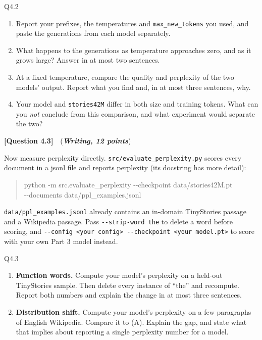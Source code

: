 \documentclass[11pt]{article}
\newcommand{\question}[3]{%
  \vspace{0.9em}
  \noindent\textbf{[Question #1]}\ \ (\textit{\textbf{#2, #3 points}})\quad
}
\begin{document}
\begin{deliverables}{Q4.2}
\begin{enumerate}[label=\Alph*., leftmargin=1.6em]
  \item Report your prefixes, the temperatures and \texttt{max\_new\_tokens} you used, and paste
    the generations from each model separately.
  \item What happens to the generations as temperature approaches zero, and as it grows large?
    Answer in at most two sentences.
  \item At a fixed temperature, compare the quality and perplexity of the two models' output.
    Report what you find and, in at most three sentences, why.
  \item Your model and \texttt{stories42M} differ in both size and training tokens. What can you
    \emph{not} conclude from this comparison, and what experiment would separate the two?
\end{enumerate}
\end{deliverables}

\question{4.3}{Writing}{12}
Now measure perplexity directly. \texttt{src/evaluate\_perplexity.py} scores every document in a
jsonl file and reports perplexity (its docstring has more detail):

\begin{quote}\small\ttfamily
python -m src.evaluate\_perplexity -\/-checkpoint data/stories42M.pt \\
\hspace*{2em}-\/-documents data/ppl\_examples.jsonl
\end{quote}

\noindent \texttt{data/ppl\_examples.jsonl} already contains an in-domain TinyStories passage and a
Wikipedia passage. Pass \texttt{-\/-strip-word the} to delete a word before scoring, and
\texttt{-\/-config <your config> -\/-checkpoint <your model.pt>} to score with your own Part 3 model
instead.

\begin{deliverables}{Q4.3}
\begin{enumerate}[label=\Alph*., leftmargin=1.6em]
  \item \textbf{Function words.} Compute your model's perplexity on a held-out TinyStories sample.
    Then delete every instance of ``the'' and recompute. Report both numbers and explain the change
    in at most three sentences.
  \item \textbf{Distribution shift.} Compute your model's perplexity on a few paragraphs of English
    Wikipedia. Compare it to (A). Explain the gap, and state what that implies about reporting a
    single perplexity number for a model.

\end{enumerate}
\end{deliverables}
\end{document}
